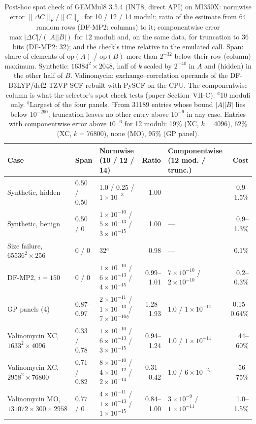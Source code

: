 \documentclass[conference]{IEEEtran}
\newcommand{\ee}[2]{#1{\times}10^{#2}}  %
\newcommand{\pct}{\%}
\begin{document}
\begin{table}[t]
\caption{Post-hoc spot check of GEMMul8 3.5.4 (INT8, direct API) on MI350X: normwise error $\|\Delta C\|_F/\|C\|_F$ for
10 / 12 / 14 moduli; ratio of the estimate from 64 random rows (DF-MP2: columns) to it; componentwise error
$\max|\Delta C|/(|A||B|)$ for 12 moduli and, on the same data, for truncation to 36 bits (DF-MP2: 32); and the check's
time relative to the emulated call. Span: share of elements of $\mathrm{op}(A)$ / $\mathrm{op}(B)$ more than $2^{-32}$
below their row (column) maximum. Synthetic: $16384^2\times2048$, half of $k$ scaled by $2^{-40}$ in $A$ and (hidden) in
the other half of $B$. Valinomycin: exchange--correlation operands of the DF-B3LYP/def2-TZVP SCF rebuilt with PySCF on
the CPU. The componentwise column is what the selector's spot check tests (paper Section~VII-C). $^{a}$10 moduli only. $^{b}$Largest of the four panels. $^{c}$From 31189 entries whose bound $|A||B|$ lies below
$10^{-290}$; truncation leaves no other entry above $10^{-9}$ in any case. Entries with componentwise error above
$10^{-6}$ for 12 moduli: 19\pct{} (XC, $k=4096$), 62\pct{} (XC, $k=76800$), none (MO), 95\pct{} (GP panel).}\label{tab:spot}
\centering\footnotesize\setlength{\tabcolsep}{4pt}
\begin{tabular}{@{}lllrlr@{}}
\toprule
Case & Span & Normwise (10 / 12 / 14) & Ratio & Componentwise (12 mod. / trunc.) & Cost \\
\midrule
Synthetic, hidden & 0.50 / 0.50 & 1.0 / 0.25 / $\ee{1}{-3}$ & 1.00 & --- & 0.9--1.5\pct \\
Synthetic, benign & 0.50 / 0 & $\ee{1}{-10}$ / $\ee{5}{-13}$ / $\ee{3}{-15}$ & 1.00 & --- & 0.9--1.3\pct \\
Size failure, $65536^2\times256$ & 0 / 0 & 32$^{a}$ & 0.98 & --- & 0.1\pct \\
DF-MP2, $i=150$ & 0 / 0 & $\ee{1}{-10}$ / $\ee{6}{-13}$ / $\ee{4}{-15}$ & 0.99--1.01 & $\ee{7}{-10}$ / $\ee{2}{-10}$ & 0.2--0.3\pct \\
GP panels (4) & 0.87--0.97 & $\ee{2}{-11}$ / $\ee{1}{-13}$ / $\ee{7}{-16}$$^{b}$ & 1.28--1.93 & 1.0 / $\ee{1}{-11}$ & 0.15--0.64\pct \\
Valinomycin XC, $1633^2\times4096$ & 0.33 / 0.78 & $\ee{1}{-10}$ / $\ee{6}{-13}$ / $\ee{3}{-15}$ & 0.94--1.24 & 1.0 / $\ee{1}{-11}$ & 44--60\pct \\
Valinomycin XC, $2958^2\times76800$ & 0.71 / 0.82 & $\ee{8}{-10}$ / $\ee{4}{-12}$ / $\ee{2}{-14}$ & 0.31--0.42 & 1.0 / $\ee{6}{-2}$$^{c}$ & 56--75\pct \\
Valinomycin MO, $131072\times300\times2958$ & 0.77 / 0 & $\ee{4}{-11}$ / $\ee{1}{-13}$ / $\ee{1}{-15}$ & 0.84--1.00 & $\ee{3}{-9}$ / $\ee{1}{-11}$ & 1.0--1.5\pct \\
\bottomrule
\end{tabular}
\end{table}
\end{document}
